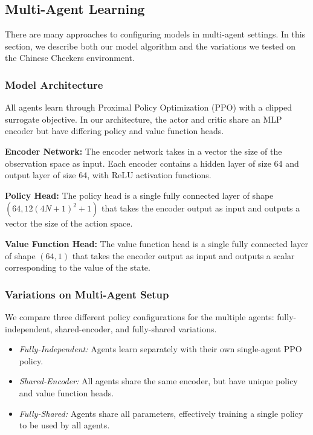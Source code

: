 \documentclass[12pt, a4paper, twocolumn]{article}
\begin{document}
\subsection{Multi-Agent Learning}

There are many approaches to configuring models in multi-agent settings. In this section, we describe both our model algorithm and the variations we tested on the Chinese Checkers environment.

\subsubsection{Model Architecture}

All agents learn through Proximal Policy Optimization (PPO) with a clipped surrogate objective\cite{PPO}. In our architecture, the actor and critic share an MLP encoder but have differing policy and value function heads.

\textbf{Encoder Network:} The encoder network takes in a vector the size of the observation space as input. Each encoder contains a hidden layer of size 64 and output layer of size 64, with ReLU activation functions.

\textbf{Policy Head:} The policy head is a single fully connected layer of shape $(64, 12(4N + 1)^2 + 1)$ that takes the encoder output as input and outputs a vector the size of the action space.

\textbf{Value Function Head:} The value function head is a single fully connected layer of shape $(64, 1)$ that takes the encoder output as input and outputs a scalar corresponding to the value of the state.

\subsubsection{Variations on Multi-Agent Setup}

We compare three different policy configurations for the multiple agents: fully-independent, shared-encoder, and fully-shared variations.
\begin{itemize}
  \item \textit{Fully-Independent:} Agents learn separately with their own single-agent PPO policy. 
  \item \textit{Shared-Encoder:} All agents share the same encoder, but have unique policy and value function heads.
  \item \textit{Fully-Shared:} Agents share all parameters, effectively training a single policy to be used by all agents.
\end{itemize}
\end{document}
